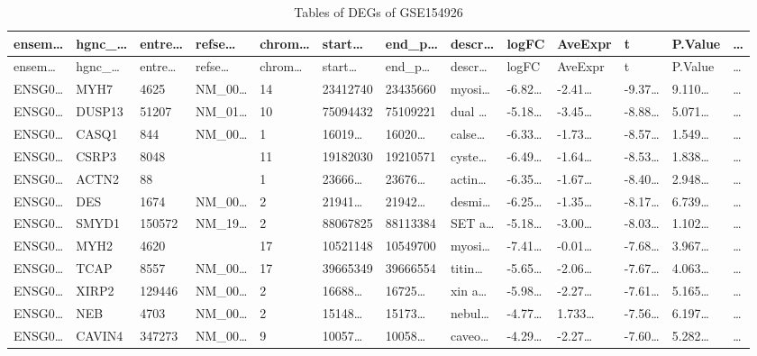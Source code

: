 \documentclass[
]{article}
\begin{document}
\begin{longtable}[]{@{}lllllllllllll@{}}
\caption{\label{tab:tables-of-DEGs-of-GSE154926}Tables of DEGs of GSE154926}\tabularnewline
\toprule
ensem\ldots{} & hgnc\_\ldots{} & entre\ldots{} & refse\ldots{} & chrom\ldots{} & start\ldots{} & end\_p\ldots{} & descr\ldots{} & logFC & AveExpr & t & P.Value & \ldots{}\tabularnewline
\midrule
\endfirsthead
\toprule
ensem\ldots{} & hgnc\_\ldots{} & entre\ldots{} & refse\ldots{} & chrom\ldots{} & start\ldots{} & end\_p\ldots{} & descr\ldots{} & logFC & AveExpr & t & P.Value & \ldots{}\tabularnewline
\midrule
\endhead
ENSG0\ldots{} & MYH7 & 4625 & NM\_00\ldots{} & 14 & 23412740 & 23435660 & myosi\ldots{} & -6.82\ldots{} & -2.41\ldots{} & -9.37\ldots{} & 9.110\ldots{} & \ldots{}\tabularnewline
ENSG0\ldots{} & DUSP13 & 51207 & NM\_01\ldots{} & 10 & 75094432 & 75109221 & dual \ldots{} & -5.18\ldots{} & -3.45\ldots{} & -8.88\ldots{} & 5.071\ldots{} & \ldots{}\tabularnewline
ENSG0\ldots{} & CASQ1 & 844 & NM\_00\ldots{} & 1 & 16019\ldots{} & 16020\ldots{} & calse\ldots{} & -6.33\ldots{} & -1.73\ldots{} & -8.57\ldots{} & 1.549\ldots{} & \ldots{}\tabularnewline
ENSG0\ldots{} & CSRP3 & 8048 & & 11 & 19182030 & 19210571 & cyste\ldots{} & -6.49\ldots{} & -1.64\ldots{} & -8.53\ldots{} & 1.838\ldots{} & \ldots{}\tabularnewline
ENSG0\ldots{} & ACTN2 & 88 & & 1 & 23666\ldots{} & 23676\ldots{} & actin\ldots{} & -6.35\ldots{} & -1.67\ldots{} & -8.40\ldots{} & 2.948\ldots{} & \ldots{}\tabularnewline
ENSG0\ldots{} & DES & 1674 & NM\_00\ldots{} & 2 & 21941\ldots{} & 21942\ldots{} & desmi\ldots{} & -6.25\ldots{} & -1.35\ldots{} & -8.17\ldots{} & 6.739\ldots{} & \ldots{}\tabularnewline
ENSG0\ldots{} & SMYD1 & 150572 & NM\_19\ldots{} & 2 & 88067825 & 88113384 & SET a\ldots{} & -5.18\ldots{} & -3.00\ldots{} & -8.03\ldots{} & 1.102\ldots{} & \ldots{}\tabularnewline
ENSG0\ldots{} & MYH2 & 4620 & & 17 & 10521148 & 10549700 & myosi\ldots{} & -7.41\ldots{} & -0.01\ldots{} & -7.68\ldots{} & 3.967\ldots{} & \ldots{}\tabularnewline
ENSG0\ldots{} & TCAP & 8557 & NM\_00\ldots{} & 17 & 39665349 & 39666554 & titin\ldots{} & -5.65\ldots{} & -2.06\ldots{} & -7.67\ldots{} & 4.063\ldots{} & \ldots{}\tabularnewline
ENSG0\ldots{} & XIRP2 & 129446 & NM\_00\ldots{} & 2 & 16688\ldots{} & 16725\ldots{} & xin a\ldots{} & -5.98\ldots{} & -2.27\ldots{} & -7.61\ldots{} & 5.165\ldots{} & \ldots{}\tabularnewline
ENSG0\ldots{} & NEB & 4703 & NM\_00\ldots{} & 2 & 15148\ldots{} & 15173\ldots{} & nebul\ldots{} & -4.77\ldots{} & 1.733\ldots{} & -7.56\ldots{} & 6.197\ldots{} & \ldots{}\tabularnewline
ENSG0\ldots{} & CAVIN4 & 347273 & NM\_00\ldots{} & 9 & 10057\ldots{} & 10058\ldots{} & caveo\ldots{} & -4.29\ldots{} & -2.27\ldots{} & -7.60\ldots{} & 5.282\ldots{} & \ldots{}\tabularnewline

\end{longtable}
\end{document}
